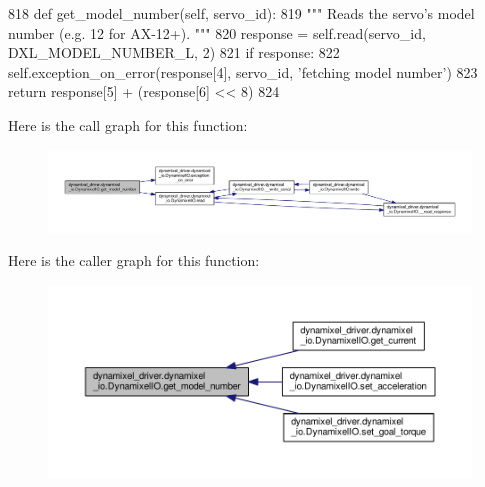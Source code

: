 \begin{DoxyCode}
818     \textcolor{keyword}{def }get\_model\_number(self, servo\_id):
819         \textcolor{stringliteral}{""" Reads the servo's model number (e.g. 12 for AX-12+). """}
820         response = self.read(servo\_id, DXL\_MODEL\_NUMBER\_L, 2)
821         \textcolor{keywordflow}{if} response:
822             self.exception\_on\_error(response[4], servo\_id, \textcolor{stringliteral}{'fetching model number'})
823         \textcolor{keywordflow}{return} response[5] + (response[6] << 8)
824 
\end{DoxyCode}
Here is the call graph for this function\+:
\nopagebreak
\begin{figure}[H]
\begin{center}
\leavevmode
\includegraphics[width=350pt]{dd/d77/classdynamixel__driver_1_1dynamixel__io_1_1_dynamixel_i_o_a3f2d1b9ac285fb0490edfd2a4c7243c2_cgraph}
\end{center}
\end{figure}
Here is the caller graph for this function\+:
\nopagebreak
\begin{figure}[H]
\begin{center}
\leavevmode
\includegraphics[width=350pt]{dd/d77/classdynamixel__driver_1_1dynamixel__io_1_1_dynamixel_i_o_a3f2d1b9ac285fb0490edfd2a4c7243c2_icgraph}
\end{center}
\end{figure}
\mbox{\label{classdynamixel__driver_1_1dynamixel__io_1_1_dynamixel_i_o_ac0f3bb1c05808fb34281f30ba9c43800}} 
